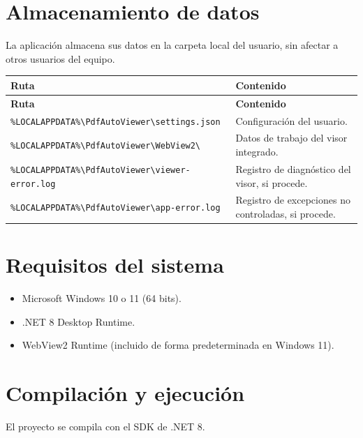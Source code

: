 \documentclass[11pt,a4paper]{article}
\newcommand{\bs}{\textbackslash\allowbreak}
\newcommand{\ruta}[1]{\texttt{\small #1}}
\begin{document}
\section{Almacenamiento de datos}
La aplicación almacena sus datos en la carpeta local del usuario, sin afectar a
otros usuarios del equipo.

\begin{xltabular}{\textwidth}{@{} L p{4.2cm} @{}}
\toprule
\textbf{Ruta} & \textbf{Contenido} \\
\midrule
\endfirsthead
\toprule
\textbf{Ruta} & \textbf{Contenido} \\
\midrule
\endhead
\bottomrule
\endfoot
\ruta{\%LOCALAPPDATA\%\bs PdfAutoViewer\bs settings.json} & Configuración del usuario. \\
\ruta{\%LOCALAPPDATA\%\bs PdfAutoViewer\bs WebView2\bs} & Datos de trabajo del visor integrado. \\
\ruta{\%LOCALAPPDATA\%\bs PdfAutoViewer\bs viewer-error.log} & Registro de diagnóstico del visor, si procede. \\
\ruta{\%LOCALAPPDATA\%\bs PdfAutoViewer\bs app-error.log} & Registro de excepciones no controladas, si procede. \\
\bottomrule
\end{xltabular}

\section{Requisitos del sistema}
\begin{itemize}[leftmargin=1.4em,itemsep=2pt]
  \item Microsoft Windows 10 o 11 (64 bits).
  \item .NET 8 Desktop Runtime.
  \item WebView2 Runtime (incluido de forma predeterminada en Windows 11).
\end{itemize}

\section{Compilación y ejecución}
El proyecto se compila con el SDK de .NET 8.
\end{document}
